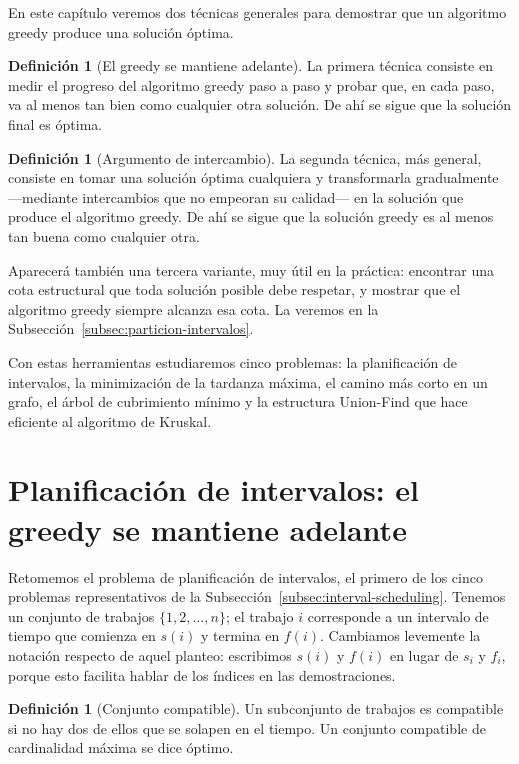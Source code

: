 \documentclass[12pt, spanish, oneside, openany]{book}
\theoremstyle{uprightplain}
\theoremstyle{definition}
\newtheorem{definicion}[teorema]{Definición}
\theoremstyle{remark}
\theoremstyle{definition}
\begin{document}
En este capítulo veremos dos técnicas generales para demostrar que un algoritmo greedy produce una solución óptima.

\begin{definicion}[El greedy se mantiene adelante]
\label{def:mantiene-adelante}
La primera técnica consiste en medir el progreso del algoritmo greedy paso a paso y probar que, en cada paso, va al menos tan bien como cualquier otra solución. De ahí se sigue que la solución final es óptima.
\end{definicion}

\begin{definicion}[Argumento de intercambio]
\label{def:intercambio}
La segunda técnica, más general, consiste en tomar una solución óptima cualquiera y transformarla gradualmente ---mediante intercambios que no empeoran su calidad--- en la solución que produce el algoritmo greedy. De ahí se sigue que la solución greedy es al menos tan buena como cualquier otra.
\end{definicion}

Aparecerá también una tercera variante, muy útil en la práctica: encontrar una cota estructural que toda solución posible debe respetar, y mostrar que el algoritmo greedy siempre alcanza esa cota. La veremos en la Subsección~\ref{subsec:particion-intervalos}.

Con estas herramientas estudiaremos cinco problemas: la planificación de intervalos, la minimización de la tardanza máxima, el camino más corto en un grafo, el árbol de cubrimiento mínimo y la estructura Union-Find que hace eficiente al algoritmo de Kruskal.


\section{Planificación de intervalos: el greedy se mantiene adelante}
\label{sec:interval-scheduling}

Retomemos el problema de planificación de intervalos, el primero de los cinco problemas representativos de la Subsección~\ref{subsec:interval-scheduling}. Tenemos un conjunto de trabajos $\{1,2,\dots,n\}$; el trabajo $i$ corresponde a un intervalo de tiempo que comienza en $s(i)$ y termina en $f(i)$. Cambiamos levemente la notación respecto de aquel planteo: escribimos $s(i)$ y $f(i)$ en lugar de $s_i$ y $f_i$, porque esto facilita hablar de los índices en las demostraciones.

\begin{definicion}[Conjunto compatible]
\label{def:compatible}
Un subconjunto de trabajos es compatible si no hay dos de ellos que se solapen en el tiempo. Un conjunto compatible de cardinalidad máxima se dice óptimo.
\end{definicion}
\end{document}
